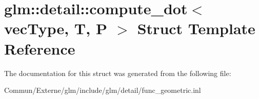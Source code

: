 \hypertarget{structglm_1_1detail_1_1compute__dot}{}\section{glm\+:\+:detail\+:\+:compute\+\_\+dot$<$ vec\+Type, T, P $>$ Struct Template Reference}
\label{structglm_1_1detail_1_1compute__dot}


The documentation for this struct was generated from the following file\+:\begin{DoxyCompactItemize}
\item 
Commun/\+Externe/glm/include/glm/detail/func\+\_\+geometric.\+inl\end{DoxyCompactItemize}
